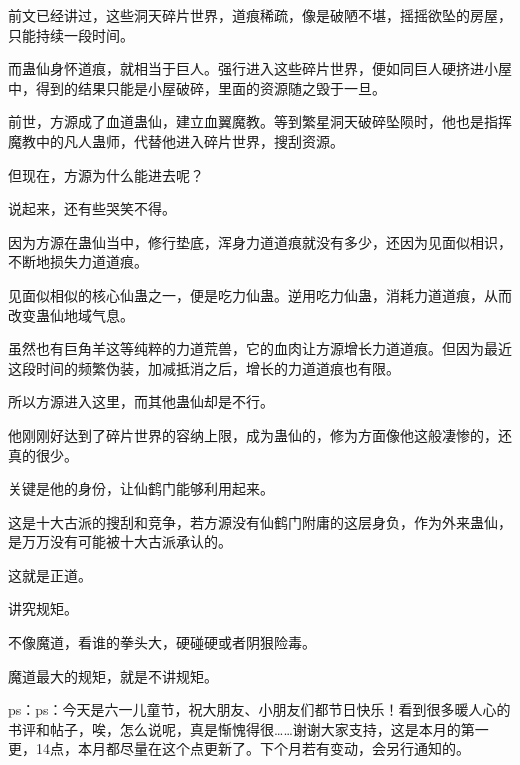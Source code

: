 \begin{this_body}
前文已经讲过，这些洞天碎片世界，道痕稀疏，像是破陋不堪，摇摇欲坠的房屋，只能持续一段时间。

而蛊仙身怀道痕，就相当于巨人。强行进入这些碎片世界，便如同巨人硬挤进小屋中，得到的结果只能是小屋破碎，里面的资源随之毁于一旦。

前世，方源成了血道蛊仙，建立血翼魔教。等到繁星洞天破碎坠陨时，他也是指挥魔教中的凡人蛊师，代替他进入碎片世界，搜刮资源。

但现在，方源为什么能进去呢？

说起来，还有些哭笑不得。

因为方源在蛊仙当中，修行垫底，浑身力道道痕就没有多少，还因为见面似相识，不断地损失力道道痕。

见面似相似的核心仙蛊之一，便是吃力仙蛊。逆用吃力仙蛊，消耗力道道痕，从而改变蛊仙地域气息。

虽然也有巨角羊这等纯粹的力道荒兽，它的血肉让方源增长力道道痕。但因为最近这段时间的频繁伪装，加减抵消之后，增长的力道道痕也有限。

所以方源进入这里，而其他蛊仙却是不行。

他刚刚好达到了碎片世界的容纳上限，成为蛊仙的，修为方面像他这般凄惨的，还真的很少。

关键是他的身份，让仙鹤门能够利用起来。

这是十大古派的搜刮和竞争，若方源没有仙鹤门附庸的这层身负，作为外来蛊仙，是万万没有可能被十大古派承认的。

这就是正道。

讲究规矩。

不像魔道，看谁的拳头大，硬碰硬或者阴狠险毒。

魔道最大的规矩，就是不讲规矩。

ps：ps：今天是六一儿童节，祝大朋友、小朋友们都节日快乐！看到很多暖人心的书评和帖子，唉，怎么说呢，真是惭愧得很……谢谢大家支持，这是本月的第一更，14点，本月都尽量在这个点更新了。下个月若有变动，会另行通知的。

\end{this_body}

